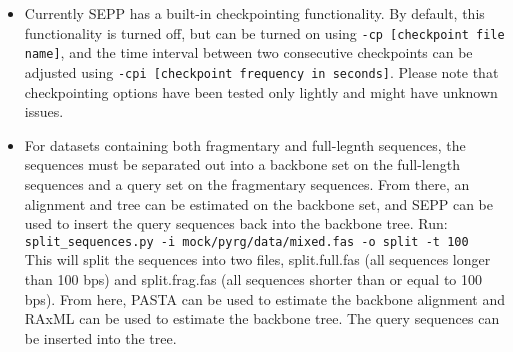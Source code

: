 \documentclass[11pt]{article} %
\newcommand{\sepp}{SEPP\xspace}
\newcommand{\ins}[1]{{\tt #1}}
\newcommand{\file}[1]{{\sf #1}}
\newcommand{\pplacer}{pplacer\xspace}
\begin{document}
\begin{itemize}
tells \sepp that \pplacer binaries can be found under \file{/some/path}.

An example config file is available as part of the distribution under the test directory (\file{test/unittest/data/simulated/sample.config}). 
A main configuration file under \file{\{home\}/.sepp/main.config} is used
to store some basic configurations such as the location of extra programs, etc.
When conflicting options are given, precedence is with those provided through commandline, then those specified in config file provided using \ins{-c} option and finally those specified in the main config file.  To test running from the config file, \ins{cd simulated} directory and run\\
\ins{run\_sepp.py -c test.config}

\item Currently \sepp has a built-in checkpointing functionality.
By default, this functionality is turned off, but can be turned on using \ins{-cp [checkpoint file name]}, 
and the time interval between two consecutive checkpoints can be adjusted using \ins{-cpi [checkpoint frequency in seconds]}.
Please note that checkpointing options have been tested only lightly and might have unknown issues. 

\item For datasets containing both fragmentary and full-legnth sequences, the sequences must be separated out into a backbone set on the full-length sequences and a query set on the fragmentary sequences.  
From there, an alignment and tree can be estimated on the backbone set, 
and SEPP can be used to insert the query sequences back into the backbone tree.  Run:\\
\ins{split\_sequences.py -i mock/pyrg/data/mixed.fas -o split -t 100}\\

This will split the sequences into two files, split.full.fas (all sequences longer than 100 bps) and split.frag.fas 
(all sequences shorter than or equal to 100 bps).  From here, PASTA can be used to estimate the backbone alignment and RAxML can be used to estimate the backbone tree.  The query sequences can be inserted into the tree.
\end{itemize}

\newpage



\end{document}
